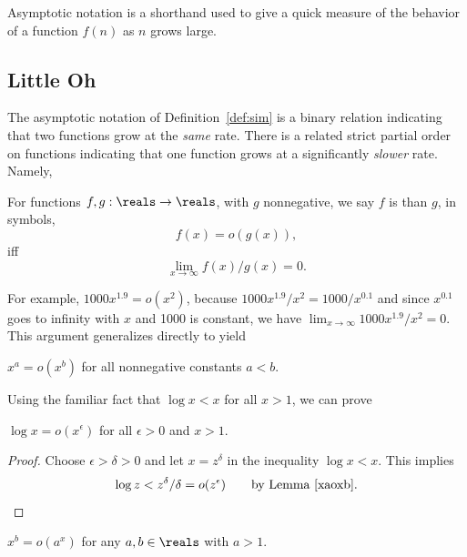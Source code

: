 \label{asymptotic_sec}

Asymptotic notation is a shorthand used to give a quick measure of the
behavior of a function $f(n)$ as $n$ grows large.

\subsection{Little Oh}

The asymptotic notation \idx{$\sim$} of Definition~\ref{def:sim} is a
binary relation indicating that two functions grow at the \emph{same}
rate.  There is a related strict partial order on functions indicating
that one function grows at a significantly \emph{slower} rate.  Namely,
\begin{definition}
  For functions $f,g: \reals \to \reals$, with $g$ nonnegative, we say $f$
  is  than
  $g$, in symbols,
\[
f(x) = o(g(x)),
\]
iff
\[
\lim_{x \rightarrow \infty} f(x)/g(x) = 0.
\]
\end{definition}

For example, $1000x^{1.9} = o(x^2)$, because $1000x^{1.9}/x^2 =
1000/x^{0.1}$ and since $x^{0.1}$ goes to infinity with $x$ and 1000 is
constant, we have $\lim_{x \rightarrow \infty} 1000x^{1.9}/x^2 = 0$.
This argument generalizes directly to yield
\begin{lemma}\label{xaoxb}
$x^a = o(x^b)$ for all nonnegative constants $a<b$.
\end{lemma}

Using the familiar fact that  $\log x < x$ for all $x >1$, we can prove
\begin{lemma}\label{logxxe}
$\log x = o(x^{\epsilon})$ for all $\epsilon >0$ and $x > 1$.
\end{lemma}

\begin{proof}
Choose $\epsilon > \delta > 0$ and let $x = z^\delta$ in the inequality
$\log x < x$.  This implies
\begin{equation}\label{zdd}
\log z  <  z^{\delta}/\delta
 =  o(z^{\epsilon})\qquad \text{by Lemma~\ref{xaoxb}}.
\end{equation}
\end{proof}

\begin{corollary}\label{xbax}
$x^b = o(a^x)$ for any $a,b \in \reals$ with $a>1$.
\end{corollary}

